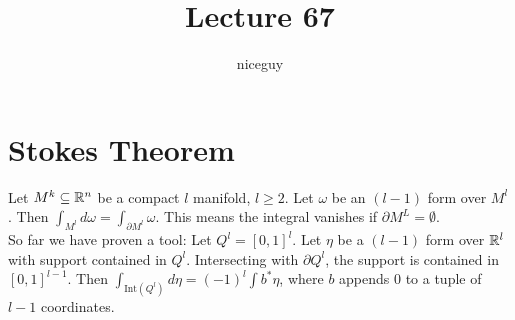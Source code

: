 \documentclass[12pt]{article}
\title{Lecture 67}
\author{niceguy}
\begin{document}
\maketitle

\section{Stokes Theorem}

Let $M^k \subseteq \mathbb{R}^n$ be a compact $l$ manifold, $l \ge 2$. Let $\omega$ be an $(l - 1)$ form over $M^l$. Then $\int_{M^l} d\omega = \int_{\partial M^l}\omega$. This means the integral vanishes if $\partial M^L = \emptyset$. \\

So far we have proven a tool: Let $Q^l = [0,1]^l$. Let $\eta$ be a $(l-1)$ form over $\mathbb{R}^l$ with support contained in $Q^l$. Intersecting with $\partial Q^l$, the support is contained in $[0,1]^{l-1}$. Then $\int_{\text{Int}(Q^l)} d\eta = (-1)^l \int b^*\eta$, where $b$ appends 0 to a tuple of $l-1$ coordinates. \\
\end{document}
